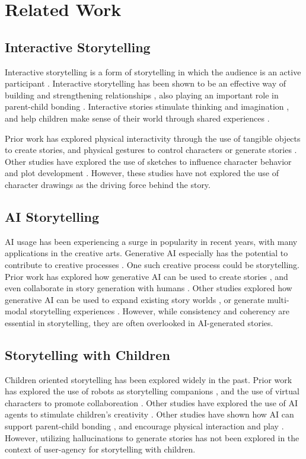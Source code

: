 \documentclass[submit,techrep,english]{ipsj}
\begin{document}
\section{Related Work}
\label{sec:related-work}

\subsection{Interactive Storytelling}
Interactive storytelling is a form of storytelling in which the audience is an active participant \cite{14:WangRCRMB22}. Interactive storytelling has been shown to be an effective way of building and strengthening relationships \cite{15:SchlauchSG22}, also playing an important role in parent-child bonding \cite{12:ZhangXWYRWYWL22}. Interactive stories stimulate thinking and imagination \cite{11:LimaGV20}, and help children make sense of their world through shared experiences \cite{9:RyokaiC99}.

Prior work has explored physical interactivity through the use of tangible objects \cite{9:RyokaiC99} to create stories, and physical gestures to control characters \cite{2:LiuLWCS12} or generate stories \cite{3:ZhaoB23}. Other studies have explored the use of sketches to influence character behavior and plot development \cite{11:LimaGV20}. However, these studies have not explored the use of character drawings as the driving force behind the story.

\subsection{AI Storytelling}
AI usage has been experiencing a surge in popularity in recent years, with many applications in the creative arts. Generative AI especially has the potential to contribute to creative processes \cite{6:TholanderJ23}. One such creative process could be storytelling. Prior work has explored how generative AI can be used to create stories \cite{13:abs-2011-04242}, and even collaborate in story generation with humans \cite{8:ShakeriND21}. Other studies explored how generative AI can be used to expand existing story worlds \cite{10:ChopraVSS21}, or generate multi-modal storytelling experiences \cite{4:HanC23}. However, while consistency and coherency are essential in storytelling, they are often overlooked in AI-generated stories.

\subsection{Storytelling with Children}
Children oriented storytelling has been explored widely in the past. Prior work has explored the use of robots as storytelling companions \cite{7:SunLLL17}, and the use of virtual characters to promote collaboreation \cite{2:LiuLWCS12}. Other studies have explored the use of AI agents to stimulate children's creativity \cite{1:ElgarfP22}. Other studies have shown how AI can support parent-child bonding \cite{12:ZhangXWYRWYWL22}, and encourage physical interaction and play \cite{3:ZhaoB23}.
However, utilizing hallucinations to generate stories has not been explored in the context of user-agency for storytelling with children.
\end{document}
